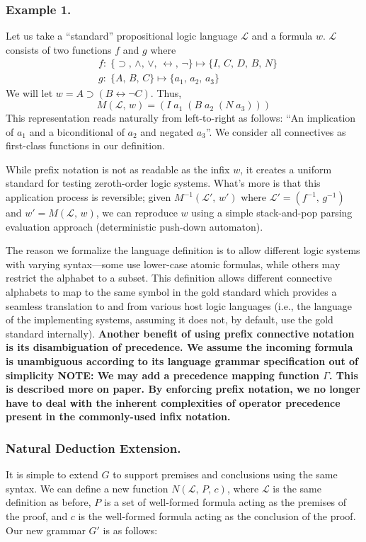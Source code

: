 \documentclass[ms]{uncgdissertationexp2}
\theoremstyle{plain}
\theoremstyle{definition}
\theoremstyle{remark}
\begin{document}
\subsubsection{Example 1.} Let us take a ``standard'' propositional logic language $\mathcal{L}$ and a formula $w$. $\mathcal{L}$ consists of two functions $f$ and $g$ where
\begin{align*}
	  & f:\;\{\supset,\,\land,\,\lor,\,\leftrightarrow,\,\lnot\}\mapsto \{I,\,C,\,D,\,B,\,N\} \\
	  & g:\;\{A,\,B,\,C\} \mapsto \{a_{1},\,a_{2},\,a_{3}\}                                   
\end{align*}
We will let $w = A \supset (B \leftrightarrow \lnot C)$. Thus, 
\[
	M(\mathcal{L},\,w) = (I\;a_{1}\;(B\;a_{2}\;(N\;a_{3})))
\]
This representation reads naturally from left-to-right as follows: ``An implication of $a_1$ and a biconditional of $a_2$ and negated $a_3$''. We consider all connectives as first-class functions in our definition.

While prefix notation is not as readable as the infix $w$, it creates a uniform standard for testing zeroth-order logic systems. What's more is that this application process is reversible; given $M^{-1}(\mathcal{L}',\,w')$ where $\mathcal{L}' = (f^{-1},\,g^{-1})$ and $w' = M(\mathcal{L},\,w)$, we can reproduce $w$ using a simple stack-and-pop parsing evaluation approach (deterministic push-down automaton).
    
The reason we formalize the language definition is to allow different logic systems with varying syntax---some use lower-case atomic formulas, while others may restrict the alphabet to a subset. This definition allows different connective alphabets to map to the same symbol in the gold standard which provides a seamless translation to and from various host logic languages (i.e., the language of the implementing systems, assuming it does not, by default, use the gold standard internally). \textbf{Another benefit of using prefix connective notation is its disambiguation of precedence. We assume the incoming formula is unambiguous according to its language grammar specification out of simplicity NOTE: We may add a precedence mapping function $\Gamma$. This is described more on paper. By enforcing prefix notation, we no longer have to deal with the inherent complexities of operator precedence present in the commonly-used infix notation.}

\subsubsection{Natural Deduction Extension.} It is simple to extend $G$ to support premises and conclusions using the same syntax. We can define a new function $N(\mathcal{L},\,P,\,c)$, where $\mathcal{L}$ is the same definition as before, $P$ is a set of well-formed formula acting as the premises of the proof, and $c$ is the well-formed formula acting as the conclusion of the proof. Our new grammar $G'$ is as follows:
\end{document}

